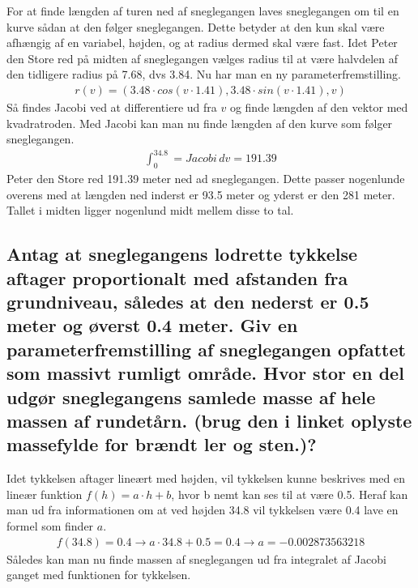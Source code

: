 For at finde længden af turen ned af sneglegangen laves sneglegangen om til en kurve sådan at den følger sneglegangen. Dette betyder at den kun skal være afhængig af en variabel, højden, og at radius dermed skal være fast. Idet Peter den Store red på midten af sneglegangen vælges radius til at være halvdelen af den tidligere radius på 7.68, dvs 3.84.
Nu har man en ny parameterfremstilling.
\begin{align}
    r(v) = (3.48 \cdot cos(v \cdot 1.41), 3.48 \cdot sin(v\cdot 1.41), v)
\end{align}
Så findes Jacobi ved at differentiere ud fra $v$ og finde længden af den vektor med kvadratroden. 
Med Jacobi kan man nu finde længden af den kurve som følger sneglegangen.
\begin{align}
    \int^{34.8}_0 = Jacobi \,dv = 191.39
\end{align}
Peter den Store red 191.39 meter ned ad sneglegangen. Dette passer nogenlunde overens med at længden ned inderst er 93.5 meter og yderst er den 281 meter. Tallet i midten ligger nogenlund midt mellem disse to tal. 

\subsection{Antag at sneglegangens lodrette tykkelse aftager proportionalt med afstanden fra grundniveau, således at den nederst er 0.5 meter og øverst 0.4 meter. Giv en parameterfremstilling af sneglegangen opfattet som massivt rumligt område. Hvor stor en del udgør sneglegangens samlede masse af hele massen af rundetårn. (brug den i linket oplyste massefylde for brændt ler og sten.)?}

Idet tykkelsen aftager lineært med højden, vil tykkelsen kunne beskrives med en lineær funktion $f(h)=a \cdot h + b$, hvor b nemt kan ses til at være 0.5. Heraf kan man ud fra informationen om at ved højden 34.8 vil tykkelsen være 0.4 lave en formel som finder $a$.
\begin{align}
    f(34.8) = 0.4 \rightarrow a \cdot 34.8 + 0.5 = 0.4 \rightarrow a = -0.002873563218
\end{align}
Således kan man nu finde massen af sneglegangen ud fra integralet af Jacobi ganget med funktionen for tykkelsen.